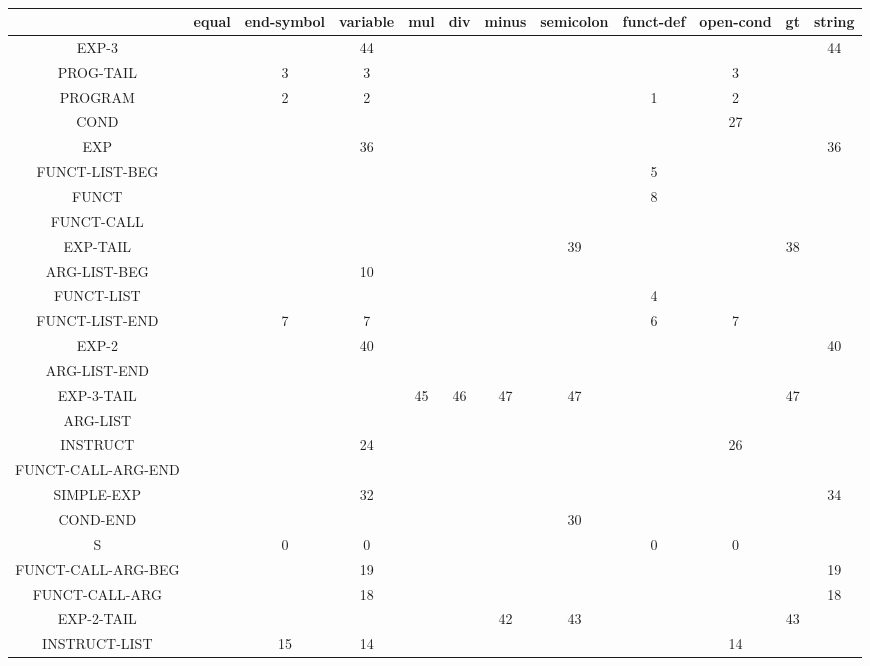 \documentclass[a4paper,10pt]{article}
\begin{document}
 ~\\


\hspace{-3.0cm}\begin{tabular}{|c|c|c|c|c|c|c|c|c|c|c|c|}	
\hline
& equal&	end-symbol&	variable&	mul&	div&	minus&	semicolon&	funct-def&	open-cond&	gt&	string \\ \hline
EXP-3				& & 	& 44	& 	& 	& 	& 	& 	& 	& 	& 44  \\ \hline 
PROG-TAIL			& & 3	& 3		& 	& 	& 	& 	& 	& 3	& 	& 	  \\ \hline 
PROGRAM				& & 2	& 2		& 	& 	& 	& 	& 1	& 2	& 	& 	  \\ \hline 
COND				& & 	&		& 	& 	& 	& 	& 	& 27& 	& 	 	 \\ \hline 
EXP					& & 	&	36	& 	& 	& 	& 	& 	& 	& 	& 36 	  \\ \hline 
FUNCT-LIST-BEG		& & 	&		& 	& 	& 	& 	& 5	& 	& 	& 	  \\ \hline 
FUNCT				& & 	& 		& 	& 	& 	& 	& 8	& 	& 	& 	 	  \\ \hline 
FUNCT-CALL			& & 	& 		& 	& 	& 	& 	& 	& 	& 	& 	 	 \\ \hline 
EXP-TAIL			& & 	& 		& 	& 	& 	& 39& 	& 	& 38& 	 	 \\ \hline 
ARG-LIST-BEG		& & 	& 10	& 	& 	& 	& 	& 	& 	& 	& 	 	 \\ \hline 
FUNCT-LIST			& & 	& 		& 	& 	& 	& 	& 4	& 	& 	& 	 	 \\ \hline 
FUNCT-LIST-END		& & 7	& 7		& 	& 	& 	& 	& 6	& 7	& 	& 	 	 \\ \hline 
EXP-2				& & 	& 40	& 	& 	& 	& 	& 	& 	& 	& 40 	 \\ \hline 
ARG-LIST-END		& & 	& 		& 	& 	& 	& 	& 	& 	& 	& 	  \\ \hline 
EXP-3-TAIL			& & 	& 		& 45& 46& 47& 47& 	& 	& 47& 	 	\\ \hline 
ARG-LIST			& & 	& 		& 	& 	& 	& 	& 	& 	& 	& 	  \\ \hline 
INSTRUCT			& & 	& 24	& 	& 	& 	& 	& 	& 26& 	& 	  \\ \hline 
FUNCT-CALL-ARG-END	& & 	& 		& 	& 	& 	& 	& 	& 	& 	& 	 	 \\ \hline 
SIMPLE-EXP			& & 	& 32	& 	& 	& 	& 	& 	& 	& 	& 34   \\ \hline 
COND-END			& & 	& 		& 	& 	& 	& 30& 	& 	& 	& 	 	 \\ \hline 
S					& & 0	& 0		& 	& 	& 	& 	& 0	& 0	& 	& 	   \\ \hline 
FUNCT-CALL-ARG-BEG	& & 	& 19	& 	& 	& 	& 	& 	& 	& 	& 19 	  \\ \hline 
FUNCT-CALL-ARG		& & 	& 18	& 	& 	& 	& 	& 	& 	& 	& 18 	  \\ \hline 
EXP-2-TAIL			& & 	& 		& 	& 	& 42& 43& 	& 	& 43& 	 	 \\ \hline 
INSTRUCT-LIST		& & 15	& 14	& 	& 	& 	& 	& 	& 14& 	& 	   \\ \hline 

\end{tabular}
\end{document}
